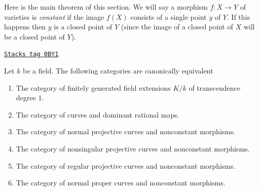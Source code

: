 Here is the main theorem of this section. We will say a morphism
$f : X \to Y$ of varieties is {\it constant} if the image $f(X)$
consists of a single point $y$ of $Y$. If this happens then
$y$ is a closed point of $Y$ (since the image of a closed point
of $X$ will be a closed point of $Y$).

\begin{theorem}
\label{curves-theorem-curves-rational-maps}
\href{https://stacks.math.columbia.edu/tag/0BY1}{\texttt{Stacks tag 0BY1}}

Let $k$ be a field. The following categories are canonically equivalent
\begin{enumerate}
\item The category of finitely generated field extensions $K/k$ of
transcendence degree $1$.
\item The category of curves and dominant rational maps.
\item The category of normal projective curves and nonconstant morphisms.
\item The category of nonsingular projective curves and nonconstant morphisms.
\item The category of regular projective curves and nonconstant morphisms.
\item The category of normal proper curves and nonconstant morphisms.
\end{enumerate}
\end{theorem}

